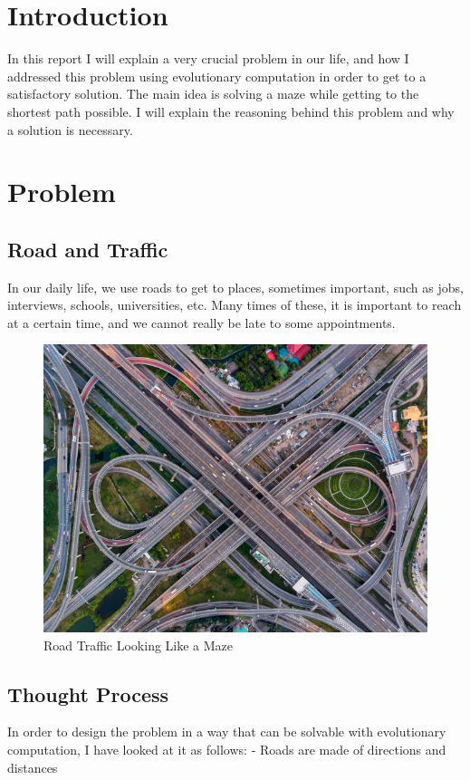 \documentclass{article}
\begin{document}
\section{Introduction}
In this report I will explain a very crucial problem in our life, and how I addressed this problem using evolutionary computation in order to get to a satisfactory solution. The main idea is solving a maze while getting to the shortest path possible. I will explain the reasoning behind this problem and why a solution is necessary.
\section{Problem}
\subsection{Road and Traffic}
In our daily life, we use roads to get to places, sometimes important, such as jobs, interviews, schools, universities, etc. Many times of these, it is important to reach at a certain time, and we cannot really be late to some appointments.

\begin{figure}[htb!]
\centerline
{\includegraphics[width=130mm,scale=1.0]{roadtraffic.png}}
\caption{Road Traffic Looking Like a Maze}
\end{figure}

\subsection{Thought Process}
In order to design the problem in a way that can be solvable with evolutionary computation, I have looked at it as follows:
- Roads are made of directions and distances
\end{document}
